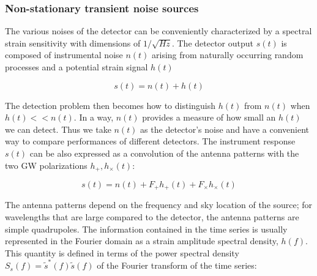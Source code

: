 \documentclass[binding=0.6cm, LaM]{sapthesis}
\begin{document}
%
%
%

\subsubsection{Non-stationary transient noise sources}
	
	The various noises of the detector can be conveniently characterized by a spectral strain
        sensitivity with dimensions of $1/\sqrt{Hz}$.
        The detector output $s(t)$ is composed of instrumental noise $n(t)$ arising from
        naturally occurring random processes and a potential strain signal $h(t)$

                \begin{equation}
                s(t) = n(t) + h(t)
                \end{equation}

        The detection problem then becomes how to distinguish $h(t)$ from $n(t)$ when $h(t) << n(t)$.
        In a way, $n(t)$ provides a measure of how small an $h(t)$ we can detect.
        Thus we take $n(t)$ as the detector’s noise and have a convenient way to
        compare performances of different detectors.
	The instrument response $s(t)$ can be also expressed as a convolution of the antenna patterns 
	with the two GW polarizations $h_{+}, h_{\times}(t)$:
	
		\begin{equation}
		s(t) = n(t) +  F_{+}h_{+} (t) + F_{\times}h_{\times}(t)
		\end{equation} 

	The antenna patterns depend on the frequency and sky location of the source; 
	for wavelengths that are large compared to the detector, the antenna patterns are simple quadrupoles.
	The information contained in the time series is usually represented in the Fourier domain 
	as a strain amplitude spectral density, $h(f)$.
	This quantity is defined in terms of the power spectral density $S_s(f) = \tilde s^{*}(f) \tilde s(f)$
	of the Fourier transform of the time series:
\end{document}
